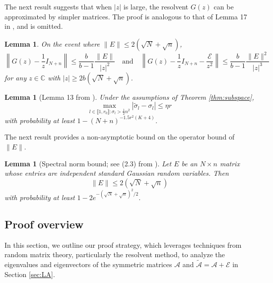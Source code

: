 \documentclass[reqno]{amsart}
\newcommand{\Prob}{\mathbb{P}}
\theoremstyle{plain}
\newtheorem{lemma}[theorem]{Lemma}
\theoremstyle{definition}
\begin{document}
The next result suggests that when $|z|$ is large, the resolvent $G(z)$ can be approximated by simpler matrices. The proof is analogous to that of Lemma 17 in \cite{OVW22}, and is omitted. 
\begin{lemma} \label{lem:simpleapprox}On the event where $\|E \| \leq 2 (\sqrt{N}+\sqrt{n})$,
\begin{equation*}
\left\| G(z) - \frac{1}{z} I_{N+n} \right\| \le \frac{b}{b-1}\frac{\| E\|}{|z|^2}
\quad\mbox{and}\quad
\left\| G(z) - \frac{1}{z} I_{N+n} - \frac{\mathcal E}{z^2}\right\| \le \frac{b}{b-1}\frac{\| E\|^2}{|z|^3}
\end{equation*}
for any $z \in \mathbb{C}$ with $|z| \geq 2b (\sqrt{N}+\sqrt{n})$.
\end{lemma}
\begin{lemma}[Lemma 13 from \cite{OVW22}]\label{lem:svloc-large}Under the assumptions of Theorem \ref{thm:subspace}, 
$$\max_{l \in \llbracket 1, r_0\rrbracket : \sigma_l >\frac{1}{2}n^2} |\widetilde \sigma_l - \sigma_l |\le \eta r$$
with probability at least $1- (N+n)^{-1.5 r^2(K+4)}$.
\end{lemma}


The next result provides a non-asymptotic bound on the operator bound of $\|E\|$. 
\begin{lemma}[Spectral norm bound; see (2.3) from \cite{MR2827856}] \label{lemma:norm}
Let $E$ be an $N \times n$ matrix whose entries are independent standard Gaussian random variables.  Then
\[ \|E \| \leq 2 (\sqrt{N}+\sqrt{n}) \]
with probability at least $1 - 2 e^{-(\sqrt{N}+\sqrt{n})^2/2}$.  %
\end{lemma}

\subsection{Proof overview}\label{sec:overview}
In this section, we outline our proof strategy, which leverages techniques from random matrix theory, particularly the resolvent method, to analyze the eigenvalues and eigenvectors of the symmetric matrices $\mathcal A$ and $\widetilde{\mathcal A}=\mathcal A + \mathcal E$ in Section \ref{sec:LA}.
\end{document}
